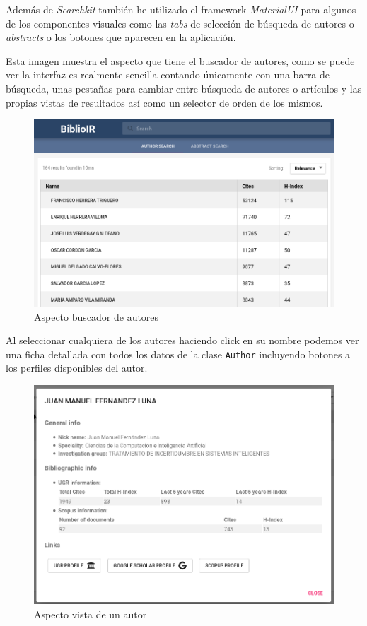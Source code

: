 Además de \textit{Searchkit} también he utilizado el \gls{framework} \textit{MaterialUI} para algunos de los componentes visuales como las \textit{tabs} de selección de búsqueda de autores o \textit{abstracts} o los botones que aparecen en la aplicación.

Esta imagen muestra el aspecto que tiene el buscador de autores, como se puede ver la interfaz es realmente sencilla contando únicamente con una barra de búsqueda, unas pestañas para cambiar entre búsqueda de autores o artículos y las propias vistas de resultados así como un selector de orden de los mismos.


\begin{figure}[h]
	
	\centering
	\includegraphics[width=\linewidth]{imagenes/AspectoBuscadorAutores}
	\caption{Aspecto buscador de autores}
\end{figure}
\newpage
Al seleccionar cualquiera de los autores haciendo click en su nombre podemos ver una ficha detallada con todos los datos de la clase \texttt{Author} incluyendo botones a los perfiles disponibles del autor.

\begin{figure}[h]
	
	\centering
	\includegraphics[width=\linewidth]{imagenes/AspectoVistaAutor}
	\caption{Aspecto vista de un autor}
\end{figure}

